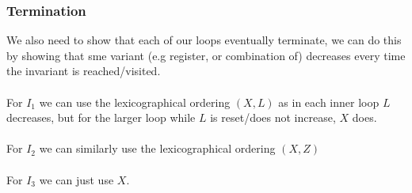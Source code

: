 \documentclass{report}
\begin{document}
\begin{itemize}
{                \subsubsection*{Termination}
                    We also need to show that each of our loops eventually terminate, we can do this by showing that sme variant (e.g register, or combination of) decreases every time the invariant is reached/visited.
                    \\
                    \\ For $I_1$ we can use the lexicographical ordering $(X,L)$ as in each inner loop $L$ decreases, but for the larger loop while $L$ is reset/does not increase, $X$ does.
                    \\
                    \\ For $I_2$ we can similarly use the lexicographical ordering $(X,Z)$
                    \\
                    \\ For $I_3$ we can just use $X$.
            }


        \end{itemize}
\end{document}
